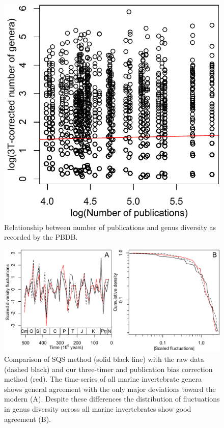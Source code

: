 \documentclass[12pt]{article}
\let\citep=\autocite
\begin{document}
\begin{figure}[!hp]
  \centering
  \includegraphics[scale=0.7]{figs/figSupp_divByPub.pdf}
  \caption[Relationship between number of publications and genus
  diversity]{Relationship between number of publications and genus
    diversity as recorded by the PBDB.}
  \label{fig:divByPub}
\end{figure}

\begin{figure}[!hp]
  \centering
  \includegraphics[scale=0.7]{figs/figSupp_sqsRaw3tpub.pdf}
  \caption[Comparison of SQS method with the raw data and three-timer
  bias correction method]{Comparison of SQS method \citep{alroy2010}
    (solid black line) with the raw data (dashed black) and our
    three-timer and publication bias correction method (red). The
    time-series of all marine invertebrate genera shows general
    agreement with the only major deviations toward the modern
    (A). Despite these differences the distribution of fluctuations in
    genus diversity across all marine invertebrates show good
    agreement (B).}
  \label{fig:supp_3TPub}
\end{figure}
\end{document}
